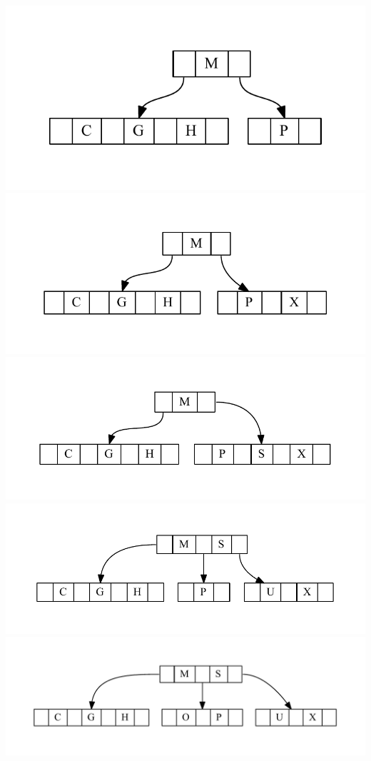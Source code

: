 \documentclass[11pt]{article}
\begin{document}
		\includegraphics[scale=.5]{step5.pdf}
		\includegraphics[scale=.5]{step6.pdf}\\
		\includegraphics[scale=.5]{step7.pdf}
		\includegraphics[scale=.5]{step8.pdf}\\
		\includegraphics[scale=.5]{step9.pdf}\\
\end{document}

